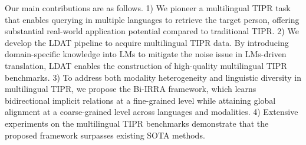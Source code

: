 \documentclass[10pt,journal,compsoc]{IEEEtran}
\begin{document}

Our main contributions are as follows.
1) We pioneer a multilingual TIPR task that enables querying in multiple languages to retrieve the target person, offering substantial real-world application potential compared to traditional TIPR.
2) We develop the LDAT pipeline to acquire multilingual TIPR data. By introducing domain-specific knowledge into LMs to mitigate the noise issue in LMs-driven translation, LDAT enables the construction of high-quality multilingual TIPR benchmarks.
3) To address both modality heterogeneity and linguistic diversity in multilingual TIPR, we propose the Bi-IRRA framework, which learns bidirectional implicit relations at a fine-grained level while attaining global alignment at a coarse-grained level across languages and modalities.
4) Extensive experiments on the multilingual TIPR benchmarks demonstrate that the proposed framework surpasses existing SOTA methods.

\end{document}
